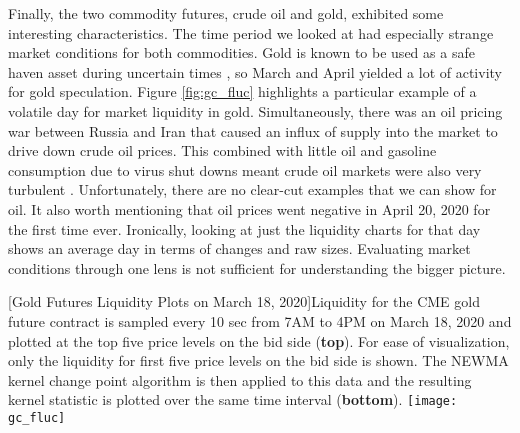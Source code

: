 Finally, the two commodity futures, crude oil and gold, exhibited some interesting characteristics. The time period we looked at had especially strange market conditions for both commodities. Gold is known to be used as a safe haven asset during uncertain times \cite{cheema20202008}, so March and April yielded a lot of activity for gold speculation. Figure \ref{fig:gc_fluc} highlights a particular example of a volatile day for market liquidity in gold. Simultaneously, there was an oil pricing war between Russia and Iran that caused an influx of supply into the market to drive down crude oil prices. This combined with little oil and gasoline consumption due to virus shut downs meant crude oil markets were also very turbulent \cite{albulescu2020coronavirus}. Unfortunately, there are no clear-cut examples that we can show for oil. It also worth mentioning that oil prices went negative in April 20, 2020 for the first time ever. Ironically, looking at just the liquidity charts for that day shows an average day in terms of changes and raw sizes. Evaluating market conditions through one lens is not sufficient for understanding the bigger picture.

\begin{center} 
[Gold Futures Liquidity Plots on March 18, 2020]{Liquidity for the CME gold future contract is sampled every 10 sec from 7AM to 4PM on March 18, 2020 and plotted at the top five price levels on the bid side (\textbf{top}). For ease of visualization, only the liquidity for first five price levels on the bid side is shown. The NEWMA kernel change point algorithm is then applied to this data and the resulting kernel statistic is plotted over the same time interval (\textbf{bottom}). } 
\texttt{[image: gc\_fluc]} 
\label{fig:gc_fluc} 
\end{center}
